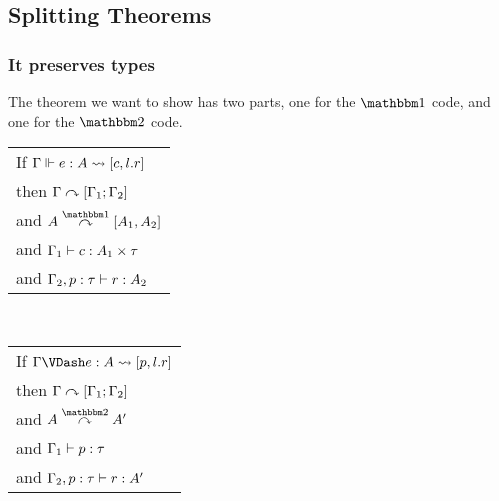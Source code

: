 \documentclass{article}
\begin{document}
\begin{figure*}
\end{figure*}

\subsection {Splitting Theorems}

\subsubsection{It preserves types}

The theorem we want to show has two parts, one for the $\bbone$ code, and one for the $\bbtwo$ code.  
\begin{center}
\begin{tabular}{l}
If $\splitone {e}{A}{c,l.r}$ \\
then $\Gamma \csplit [\Gamma_1;\Gamma_2]$ \\
and $A \tsplito [A_1,A_2]$ \\
and $ \types [\Gamma_1]{c} {A_1 \times \tau}$ \\
and $ \types [\Gamma_2, p:\tau]{r} {A_2}$ 
\end{tabular}
~~~
\begin{tabular}{l}
If $\splittwo {e}{A}{p,l.r}$ \\
then $\Gamma \csplit [\Gamma_1;\Gamma_2]$ \\
and $A \tsplits A'$ \\
and $ \types [\Gamma_1]{p} {\tau}$ \\
and $ \types [\Gamma_2, p:\tau]{r} {A'}$ 
\end{tabular}
\end{center}
\end{document}
